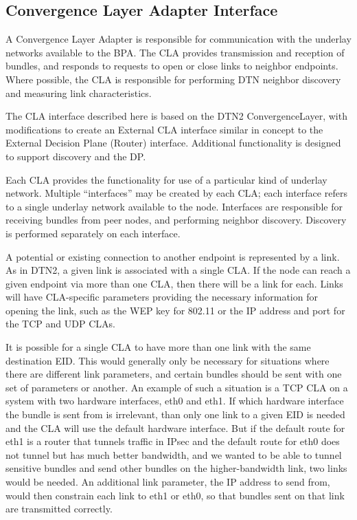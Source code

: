 \subsection{Convergence Layer Adapter Interface}

A Convergence Layer Adapter is responsible for communication with the underlay
networks available to the BPA. The CLA provides transmission and reception of
bundles, and responds to requests to open or close links to neighbor endpoints.
Where possible, the CLA is responsible for performing DTN neighbor discovery
and measuring link characteristics.

The CLA interface described here is based on the DTN2 ConvergenceLayer, with
modifications to create an External CLA interface similar in concept to the
External Decision Plane (Router) interface. Additional functionality is 
designed to support discovery and the DP.

Each CLA provides the functionality for use of a particular kind of underlay
network. Multiple ``interfaces'' may be created by each CLA; each interface
refers to a single underlay network available to the node. Interfaces are
responsible for receiving bundles from peer nodes, and performing neighbor
discovery. Discovery is performed separately on each interface.

A potential or existing connection to another endpoint is represented by a
link. As in DTN2, a given link is associated with a single CLA. If the node
can reach a given endpoint via more than one CLA, then there will be a link
for each. Links will have CLA-specific parameters providing the necessary
information for opening the link, such as the WEP key for 802.11 or the IP
address and port for the TCP and UDP CLAs.

It is possible for a single CLA to have more than one link with the same
destination EID. This would generally only be necessary for situations where
there are different link parameters, and certain bundles should be sent with
one set of parameters or another. An example of such a situation is a TCP
CLA on a system with two hardware interfaces, eth0 and eth1.  If which
hardware interface the bundle is sent from is irrelevant, than only one link
to a given EID is needed and the CLA will use the default hardware
interface. But if the default route for eth1 is a router that tunnels
traffic in IPsec and the default route for eth0 does not tunnel but has much
better bandwidth, and we wanted to be able to tunnel sensitive bundles and
send other bundles on the higher-bandwidth link, two links would be
needed. An additional link parameter, the IP address to send from, would
then constrain each link to eth1 or eth0, so that bundles sent on that link
are transmitted correctly.

